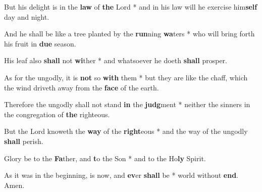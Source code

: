 \begin{multicols}{2}
	But his delight is in the \textbf{law} of \textbf{the} Lord * and in his law will he exercise him\textbf{self} day and night.
	
	And he shall be like a tree planted by the \textbf{run}ning \textbf{wa}ters * who will bring forth his fruit in \textbf{due} season.
	
	His leaf also \textbf{shall} not \textbf{wi}ther * and whatsoever he doeth \textbf{shall} prosper.
	
	As for the ungodly, it is \textbf{not} so \textbf{with} them * but they are like the chaff, which the wind driveth away from the \textbf{face} of the earth.
	
	Therefore the ungodly shall not stand \textbf{in} the \textbf{judg}ment * neither the sinners in the congregation of \textbf{the} righteous.
	
	But the Lord knoweth the \textbf{way} of the \textbf{right}eous * and the way of the ungodly \textbf{shall} perish.
	
	Glory be to the \textbf{Fa}ther, and \textbf{t}o the Son * and to the Ho\textbf{ly} Spirit.
	
	As it was in the beginning, is now, and \textbf{ev}er \textbf{shall} be * world without \textbf{end}. Amen.
\end{multicols}